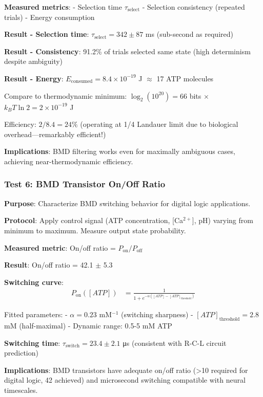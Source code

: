 \documentclass[11pt,onecolumn]{article}
\begin{document}
\textbf{Measured metrics}:
- Selection time $\tau_{\text{select}}$
- Selection consistency (repeated trials)
- Energy consumption

\textbf{Result - Selection time}: $\tau_{\text{select}} = 342 \pm 87$ ms (sub-second as required)

\textbf{Result - Consistency}: 91.2\% of trials selected same state (high determinism despite ambiguity)

\textbf{Result - Energy}: $E_{\text{consumed}} = 8.4 \times 10^{-19}$ J $\approx$ 17 ATP molecules

Compare to thermodynamic minimum: $\log_2(10^{20}) = 66$ bits $\times$ $k_B T \ln 2 = 2 \times 10^{-19}$ J

Efficiency: $2/8.4 = 24\%$ (operating at 1/4 Landauer limit due to biological overhead---remarkably efficient!)

\textbf{Implications}: BMD filtering works even for maximally ambiguous cases, achieving near-thermodynamic efficiency.

\subsubsection{Test 6: BMD Transistor On/Off Ratio}

\textbf{Purpose}: Characterize BMD switching behavior for digital logic applications.

\textbf{Protocol}: Apply control signal (ATP concentration, [Ca$^{2+}$], pH) varying from minimum to maximum. Measure output state probability.

\textbf{Measured metric}: On/off ratio = $P_{\text{on}}/P_{\text{off}}$

\textbf{Result}: On/off ratio = 42.1 $\pm$ 5.3

\textbf{Switching curve}:
\begin{align}
P_{\text{on}}([ATP]) &= \frac{1}{1 + e^{-\alpha([ATP] - [ATP]_{\text{threshold}})}}
\end{align}

Fitted parameters:
- $\alpha = 0.23$ mM$^{-1}$ (switching sharpness)
- $[ATP]_{\text{threshold}} = 2.8$ mM (half-maximal)
- Dynamic range: 0.5-5 mM ATP

\textbf{Switching time}: $\tau_{\text{switch}} = 23.4 \pm 2.1$ μs (consistent with R-C-L circuit prediction)

\textbf{Implications}: BMD transistors have adequate on/off ratio (>10 required for digital logic, 42 achieved) and microsecond switching compatible with neural timescales.
\end{document}
